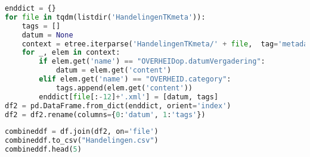 \begin{lstlisting}[language=Python]
enddict = {}
for file in tqdm(listdir('HandelingenTKmeta')):
    tags = []
    datum = None
    context = etree.iterparse('HandelingenTKmeta/' + file,  tag='metadata')
    for _, elem in context:
        if elem.get('name') == "OVERHEIDop.datumVergadering":
            datum = elem.get('content')
        elif elem.get('name') == "OVERHEID.category":
            tags.append(elem.get('content'))
        enddict[file[:-12]+'.xml'] = [datum, tags]
df2 = pd.DataFrame.from_dict(enddict, orient='index')
df2 = df2.rename(columns={0:'datum', 1:'tags'})
\end{lstlisting}

\begin{lstlisting}[language=Python]
combineddf = df.join(df2, on='file')
combineddf.to_csv("Handelingen.csv")
combineddf.head(5)
\end{lstlisting}

